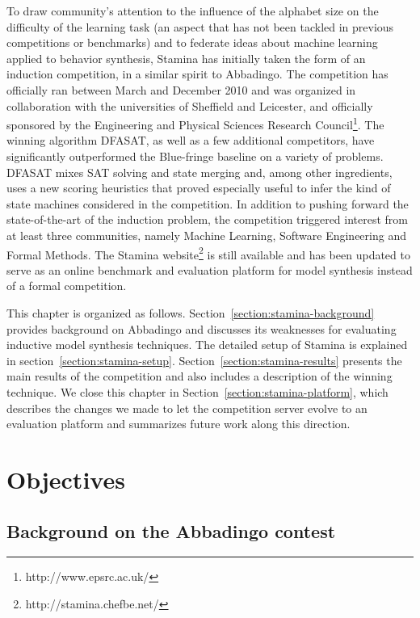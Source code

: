 To draw community's attention to the influence of the alphabet size on the difficulty of the learning task (an aspect that has not been tackled in previous competitions or benchmarks) and to federate ideas about machine learning applied to behavior synthesis, Stamina has initially taken the form of an induction competition, in a similar spirit to Abbadingo. The competition has officially ran between March and December 2010 and was organized in collaboration with the universities of Sheffield and Leicester, and officially sponsored by the Engineering and Physical Sciences Research Council\footnote{http://www.epsrc.ac.uk/}. The winning algorithm DFASAT, as well as a few additional competitors, have significantly outperformed the Blue-fringe baseline on a variety of problems. DFASAT mixes SAT solving and state merging and, among other ingredients, uses a new scoring heuristics that proved especially useful to infer the kind of state machines considered in the competition. In addition to pushing forward the state-of-the-art of the induction problem, the competition triggered interest from at least three communities, namely Machine Learning, Software Engineering and Formal Methods. The Stamina website\footnote{http://stamina.chefbe.net/} is still available and has been updated to serve as an online benchmark and evaluation platform for model synthesis instead of a formal competition.

This chapter is organized as follows. Section~\ref{section:stamina-background} provides background on Abbadingo and discusses its weaknesses for evaluating inductive model synthesis techniques. The detailed setup of Stamina is explained in section~\ref{section:stamina-setup}. Section~\ref{section:stamina-results} presents the main results of the competition and also includes a description of the winning technique. We close this chapter in Section~\ref{section:stamina-platform}, which describes the changes we made to let the competition server evolve to an evaluation platform and summarizes future work along this direction.

\section{Objectives\label{section:stamina-background}}

\subsection{Background on the Abbadingo contest\label{subsection:stamina-abbadingo}}

